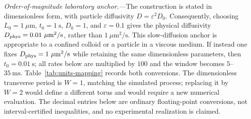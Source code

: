
\emph{Order-of-magnitude laboratory anchor.---}The construction is stated
in dimensionless form, with particle diffusivity
$D=\varepsilon^2D_0$.  Consequently, choosing
$L_0=1~\mu\mathrm m$, $t_0=1~\mathrm s$, $D_0=1$, and
$\varepsilon=0.1$ gives the physical diffusivity
$D_{\rm phys}=0.01~\mu\mathrm m^2/\mathrm s$, rather than
$1~\mu\mathrm m^2/\mathrm s$.  This slow-diffusion anchor is appropriate
to a confined colloid or a particle in a viscous medium.  If instead one
fixes $D_{\rm phys}=1~\mu\mathrm m^2/\mathrm s$ while retaining the same
dimensionless parameters, then $t_0=0.01~\mathrm s$; all rates below are
multiplied by $100$ and the window becomes $5$--$35~\mathrm{ms}$.
Table~\ref{tab:units-mapping} records both conversions.  The dimensionless
transverse period is $W=1$, matching the simulated process; replacing it
by $W=2$ would define a different torus and would require a new numerical
evaluation.  The decimal entries below are ordinary floating-point
conversions, not interval-certified inequalities, and no experimental
realization is claimed.


